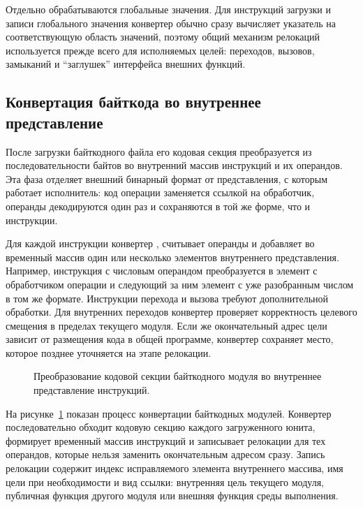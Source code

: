 Отдельно обрабатываются глобальные значения. Для инструкций загрузки и записи
глобального значения конвертер обычно сразу вычисляет указатель на
соответствующую область значений, поэтому общий механизм релокаций используется
прежде всего для исполняемых целей: переходов, вызовов, замыканий и
\enquote{заглушек} интерфейса внешних функций.

\subsection{Конвертация байткода во внутреннее представление}

После загрузки байткодного файла его кодовая секция преобразуется из последовательности байтов во
внутренний массив инструкций и их операндов. Эта фаза отделяет внешний бинарный формат от
представления, с которым работает исполнитель: код операции заменяется ссылкой на обработчик,
операнды декодируются один раз и сохраняются в той же форме, что и инструкции.

Для каждой инструкции конвертер , считывает операнды и добавляет во временный массив один или
несколько элементов внутреннего представления. Например, инструкция с числовым операндом
преобразуется в элемент с обработчиком операции и следующий за ним элемент с уже разобранным числом
в том же формате. Инструкции перехода и вызова требуют дополнительной обработки. Для внутренних переходов конвертер
проверяет корректность целевого смещения в пределах текущего модуля. Если же окончательный адрес
цели зависит от размещения кода в общей программе, конвертер сохраняет место, которое позднее
уточняется на этапе релокации.

\begin{figure}[H] \centering \resizebox{\textwidth}{!}{}
\caption{Преобразование кодовой секции байткодного модуля во внутреннее представление инструкций.}
\label{fig:bytecode-conversion} \end{figure}

На рисунке~\ref{fig:bytecode-conversion} показан процесс конвертации байткодных модулей.
Конвертер последовательно обходит кодовую секцию каждого загруженного юнита, формирует временный
массив инструкций и записывает релокации для тех операндов, которые нельзя заменить окончательным
адресом сразу. Запись релокации содержит индекс исправляемого элемента внутреннего массива, имя цели
при необходимости и вид ссылки: внутренняя цель текущего модуля, публичная функция другого модуля или
внешняя функция среды выполнения.

